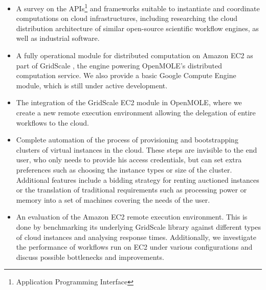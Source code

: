 \begin{itemize}
	\item A survey on the APIs\footnote{Application Programming Interface} and frameworks suitable to instantiate and coordinate computations on cloud infrastructures, including researching the cloud distribution architecture of similar open-source scientific workflow engines, as well as industrial software.
	\item A fully operational module for distributed computation on Amazon EC2 as part of GridScale \cite{Reuillon2016}, the engine powering OpenMOLE's distributed computation service. We also provide a basic Google Compute Engine module, which is still under active development.
	\item The integration of the GridScale EC2 module in OpenMOLE, where we create a new remote execution environment allowing the delegation of entire workflows to the cloud.
	\item Complete automation of the process of provisioning and bootstrapping clusters of virtual instances in the cloud. These steps are invisible to the end user, who only needs to provide his access credentials, but can set extra preferences such as choosing the instance types or size of the cluster. Additional features include a bidding strategy for renting auctioned instances or the translation of traditional requirements such as processing power or memory into a set of machines covering the needs of the user.
	\item An evaluation of the Amazon EC2 remote execution environment. This is done by benchmarking its underlying GridScale library against different types of cloud instances and analysing response times. Additionally, we investigate the performance of workflows run on EC2 under various configurations and discuss possible bottlenecks and improvements.
\end{itemize}